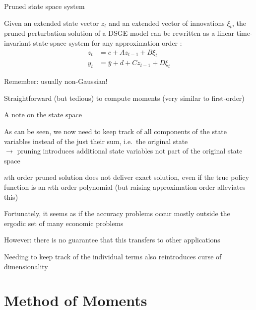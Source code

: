 \begin{frame}{Pruned state space system}
  \begin{witemize}
    \item Given an extended state vector \( z_t \) and an extended vector of innovations \( \xi_t \), the pruned perturbation solution of a DSGE model can be rewritten as a linear time-invariant state-space system for any approximation order \parencite{AndreasenEtal2018}:
    \begin{align}
      z_t & = c + A z_{t-1} + B \xi_t           \\
      y_t & = \bar{y} + d + C z_{t-1} + D \xi_t
    \end{align}
    \item Remember: usually non-Gaussian!

    \item Straightforward (but tedious) to compute moments (very similar to first-order)

  \end{witemize}

\end{frame}

\begin{frame}{A note on the state space}
  \begin{witemize}
    \item As can be seen, we now need to keep track of all components of the state variables instead of the just their sum, i.e.\ the original state\\
    $\rightarrow$ pruning introduces additional state variables not part of the original state space
    \item $n$th order pruned solution does not deliver exact solution, even if the true policy function is an $n$th order polynomial (but raising approximation order alleviates this)
    \item Fortunately, it seems as if the accuracy problems occur mostly outside the ergodic set of many economic problems
    \item However: there is no guarantee that this transfers to other applications
    \item Needing to keep track of the individual terms also reintroduces curse of dimensionality
  \end{witemize}
\end{frame}

\section{Method of Moments}


